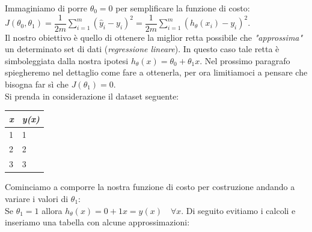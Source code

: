 \begin{esempio}
  Immaginiamo di porre $\theta_0 = 0$ per semplificare la funzione di costo: $J(\theta_0, \theta_1) = \dfrac {1}{2m} \displaystyle \sum _{i=1}^m \left ( \hat{y}_{i}- y_{i} \right)^2 = \dfrac {1}{2m} \displaystyle \sum _{i=1}^m \left (h_\theta (x_{i}) - y_{i} \right)^2$. \\ Il nostro obiettivo è quello di ottenere la miglior retta possibile che \textit{"approssima"} un determinato set di dati (\textit{regressione lineare}). In questo caso tale retta è simboleggiata dalla nostra ipotesi $h_\theta(x) = \theta_0 + \theta_1 x$. Nel prossimo paragrafo spiegheremo nel dettaglio come fare a ottenerla, per ora limitiamoci a pensare che bisogna far sì che $J(\theta_1) = 0$.\\
  Si prenda in considerazione il dataset seguente:\\
\begin{table}[H]
\centering
\begin{tabular}{|l|l|}
\hline
{\color[HTML]{FE0000} \textit{x}} & {\color[HTML]{FE0000} \textit{y(x)}} \\ \hline
1                                 & 1                                    \\ \hline
2                                 & 2                                    \\ \hline
3                                 & 3                                    \\ \hline
\end{tabular}
\end{table}
  Cominciamo a comporre la nostra funzione di costo per costruzione andando a variare i valori di $\theta_1$:\\
  Se $\theta_1 = 1$ allora  $h_\theta(x) = 0 + 1x = y(x) \,\,\,\,\,\,\forall x$. Di seguito evitiamo i calcoli e inseriamo una tabella con alcune approssimazioni:
  

\end{esempio}
